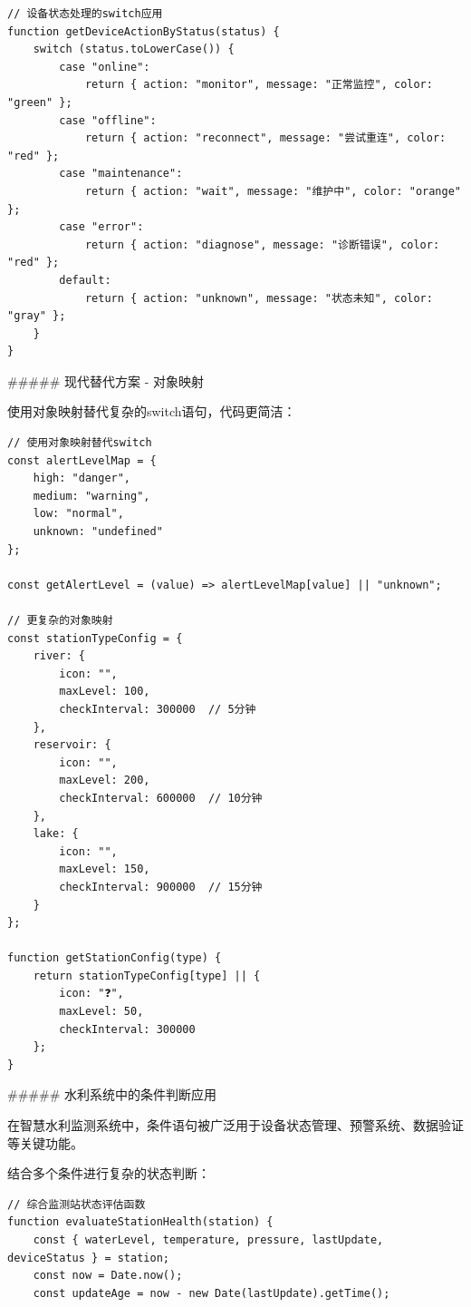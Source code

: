 {\begin{lstlisting}[style=javascript]
// 设备状态处理的switch应用
function getDeviceActionByStatus(status) {
    switch (status.toLowerCase()) {
        case "online":
            return { action: "monitor", message: "正常监控", color: "green" };
        case "offline":
            return { action: "reconnect", message: "尝试重连", color: "red" };
        case "maintenance":
            return { action: "wait", message: "维护中", color: "orange" };
        case "error":
            return { action: "diagnose", message: "诊断错误", color: "red" };
        default:
            return { action: "unknown", message: "状态未知", color: "gray" };
    }
}
\end{lstlisting}

##### 现代替代方案 - 对象映射

使用对象映射替代复杂的switch语句，代码更简洁：

\begin{lstlisting}[style=javascript]
// 使用对象映射替代switch
const alertLevelMap = {
    high: "danger",
    medium: "warning", 
    low: "normal",
    unknown: "undefined"
};

const getAlertLevel = (value) => alertLevelMap[value] || "unknown";

// 更复杂的对象映射
const stationTypeConfig = {
    river: { 
        icon: "️", 
        maxLevel: 100, 
        checkInterval: 300000  // 5分钟
    },
    reservoir: { 
        icon: "️", 
        maxLevel: 200, 
        checkInterval: 600000  // 10分钟
    },
    lake: { 
        icon: "️", 
        maxLevel: 150, 
        checkInterval: 900000  // 15分钟
    }
};

function getStationConfig(type) {
    return stationTypeConfig[type] || {
        icon: "❓",
        maxLevel: 50,
        checkInterval: 300000
    };
}
\end{lstlisting}

##### 水利系统中的条件判断应用

在智慧水利监测系统中，条件语句被广泛用于设备状态管理、预警系统、数据验证等关键功能。


结合多个条件进行复杂的状态判断：

\begin{lstlisting}[style=javascript]
// 综合监测站状态评估函数
function evaluateStationHealth(station) {
    const { waterLevel, temperature, pressure, lastUpdate, deviceStatus } = station;
    const now = Date.now();
    const updateAge = now - new Date(lastUpdate).getTime();
    

\end{lstlisting}}
